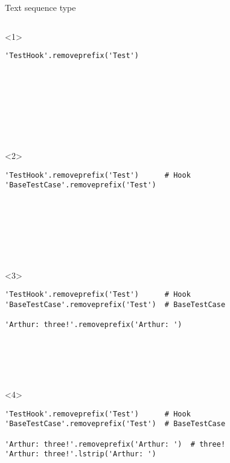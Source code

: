 \begin{frame}[fragile]{Text sequence type}

  \begin{columns}[onlytextwidth]
    \begin{column}{\textwidth}

      \begin{onlyenv}<1>
        \begin{lstlisting}[style=python,basicstyle=\small,keepspaces=true,columns=fullflexible]
'TestHook'.removeprefix('Test')









 \end{lstlisting}
      \end{onlyenv}

      \begin{onlyenv}<2>
        \begin{lstlisting}[style=python,basicstyle=\small,keepspaces=true,columns=fullflexible]
'TestHook'.removeprefix('Test')      # Hook
'BaseTestCase'.removeprefix('Test')








 \end{lstlisting}
      \end{onlyenv}

      \begin{onlyenv}<3>
        \begin{lstlisting}[style=python,basicstyle=\small,keepspaces=true,columns=fullflexible]
'TestHook'.removeprefix('Test')      # Hook
'BaseTestCase'.removeprefix('Test')  # BaseTestCase

'Arthur: three!'.removeprefix('Arthur: ')






 \end{lstlisting}
      \end{onlyenv}

      \begin{onlyenv}<4>
        \begin{lstlisting}[style=python,basicstyle=\small,keepspaces=true,columns=fullflexible]
'TestHook'.removeprefix('Test')      # Hook
'BaseTestCase'.removeprefix('Test')  # BaseTestCase

'Arthur: three!'.removeprefix('Arthur: ')  # three!
'Arthur: three!'.lstrip('Arthur: ')






\end{lstlisting}
\end{onlyenv}
\end{column}
\end{columns}
\end{frame}
